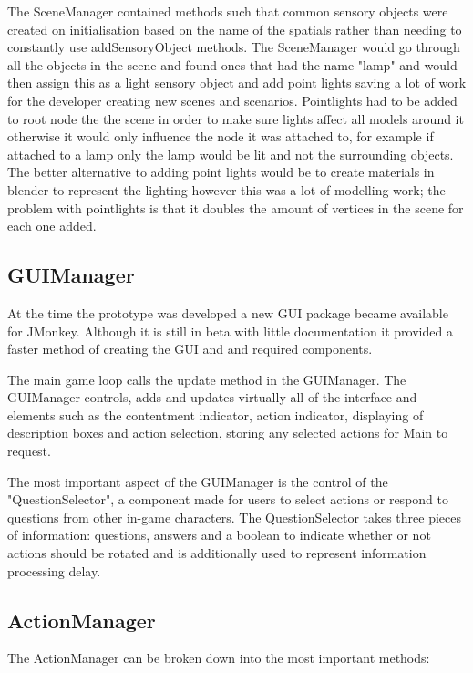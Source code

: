 \documentclass[11pt]{report}
\begin{document}
The SceneManager contained methods such that common sensory objects were created on initialisation based on the name of the spatials rather than needing to constantly use addSensoryObject methods. The SceneManager would go through all the objects in the scene and found ones that had the name "lamp" and would then assign this as a light sensory object and add point lights saving a lot of work for the developer creating new scenes and scenarios. Pointlights had to be added to root node the the scene in order to make sure lights affect all models around it otherwise it would only influence the node it was attached to, for example if attached to a lamp only the lamp would be lit and not the surrounding objects. The better alternative to adding point lights would be to create materials in blender to represent the lighting however this was a lot of modelling work; the problem with pointlights is that it doubles the amount of vertices in the scene for each one added.

\subsection{GUIManager}
At the time the prototype was developed a new GUI package became available for JMonkey. Although it is still in beta with little documentation it provided a faster method of creating the GUI and and required components. 

The main game loop calls the update method in the GUIManager. The GUIManager controls, adds and updates virtually all of the interface and elements such as the contentment indicator, action indicator, displaying of description boxes and action selection, storing any selected actions for Main to request. 

The most important aspect of the GUIManager is the control of the "QuestionSelector", a component made for users to select actions or respond to questions from other in-game characters. The QuestionSelector takes three pieces of information: questions, answers and a boolean to indicate whether or not actions should be rotated and is additionally used to represent information processing delay.


\subsection{ActionManager}
The ActionManager can be broken down into the most important methods:
\end{document}
